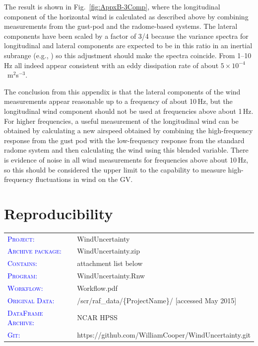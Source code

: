 \documentclass[12pt,twoside,english]{article}\usepackage[]{graphicx}\usepackage[]{color}
\providecommand{\tabularnewline}{\\}
\let\stdsection\section
\renewcommand{\section}{\newpage\stdsection}
\let\OrgIndex\index
\renewcommand*{\index}[1]{\OrgIndex{#1}}
\begin{document}
The result is shown in Fig.~\ref{fig:AppxB-3Comp}, where the longitudinal component of the horizontal wind is calculated as described above by combining measurements from the gust-pod and the radome-based systems. The lateral components have been scaled by a factor of 3/4 because the variance spectra for longitudinal and lateral components are expected to be in this ratio in an inertial subrange (e.g., \citet{batchelor1953theory}) so this adjustment should make the spectra coincide. From 1--10\,Hz all indeed appear consistent with an eddy dissipation rate of about $5\times10^{-4}$~m$^{2}$s$^{-3}$. 

The conclusion from this appendix is that the lateral components of the wind measurements appear reasonable up to a frequency of about 10\,Hz, but the longitudinal wind component should not be used at frequencies above about 1\,Hz. For higher frequencies, a useful measurement of the longitudinal wind can be obtained by calculating a new airspeed obtained by combining the high-frequency response from the gust pod with the low-frequency response from the standard radome system and then calculating the wind using this blended variable. There is evidence of noise in all wind measurements for frequencies above about 10\,Hz, so this should be considered the upper limit to the capability to measure high-frequency fluctuations in wind on the GV. 

\section{Reproducibility}


\begin{tabular}{ll}
\textsf{\textsc{\textcolor{blue}{Project:}}} & WindUncertainty\tabularnewline
\textsf{\textsc{\textcolor{blue}{Archive package:}}} & WindUncertainty.zip\tabularnewline
\textsf{\textsc{\textcolor{blue}{Contains:}}} & attachment list below\tabularnewline
\textsf{\textsc{\textcolor{blue}{Program:}}} & WindUncertainty.Rnw\tabularnewline
\textsf{\textsc{\textcolor{blue}{Workflow:}}} & Workflow.pdf\tabularnewline
\textsf{\textsc{\textcolor{blue}{Original Data:}}} & /scr/raf\_data/\{ProjectName\}/ [accessed May 2015] \tabularnewline
\textsf{\textsc{\textcolor{blue}{DataFrame Archive:}}} & NCAR HPSS\tabularnewline
\textsf{\textsc{\textcolor{blue}{Git:}}} & https://github.com/WilliamCooper/WindUncertainty.git\tabularnewline
\end{tabular}
\end{document}
